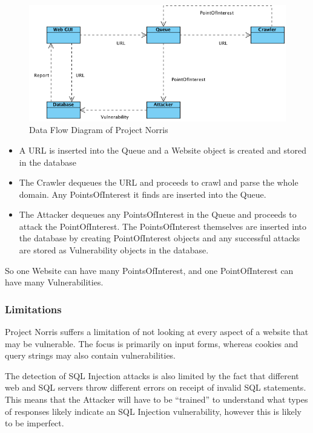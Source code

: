 \documentclass[12pt,a4paper]{article}
\begin{document}
\begin{figure}[!ht]
    \begin{center}
        \includegraphics[scale=0.5]{images/data_flow_diagram.png}    
    \end{center}
    \caption{Data Flow Diagram of Project Norris}
    \label{fig:dataflow}
\end{figure}

\begin{itemize}
    \item A URL is inserted into the Queue and a Website object is created and stored in the database
    \item The Crawler dequeues the URL and proceeds to crawl and parse the whole domain.  Any PointsOfInterest it finds are inserted into the Queue.
    \item The Attacker dequeues any PointsOfInterest in the Queue and proceeds to attack the PointOfInterest.  The PointsOfInterest themselves are inserted into the database by creating PointOfInterest objects and any successful attacks are stored as Vulnerability objects in the database.
\end{itemize}

So one Website can have many PointsOfInterest, and one PointOfInterest can have many Vulnerabilities.

\subsubsection{Limitations}
Project Norris suffers a limitation of not looking at every aspect of a website that may be vulnerable.  The focus is primarily on input forms, whereas cookies and query strings may also contain vulnerabilities.

The detection of SQL Injection attacks is also limited by the fact that different web and SQL servers throw different errors on receipt of invalid SQL statements.  This means that the Attacker will have to be “trained” to understand what types of responses likely indicate an SQL Injection vulnerability, however this is likely to be imperfect.
\end{document}
